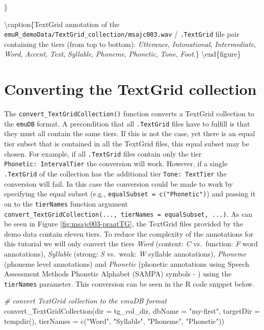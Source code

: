 \documentclass[
]{book}
\newenvironment{Shaded}{\begin{snugshade}}{\end{snugshade}}
\newcommand{\AttributeTok}[1]{\textcolor[rgb]{0.77,0.63,0.00}{#1}}
\newcommand{\CommentTok}[1]{\textcolor[rgb]{0.56,0.35,0.01}{\textit{#1}}}
\newcommand{\FunctionTok}[1]{\textcolor[rgb]{0.00,0.00,0.00}{#1}}
\newcommand{\NormalTok}[1]{#1}
\newcommand{\StringTok}[1]{\textcolor[rgb]{0.31,0.60,0.02}{#1}}
\begin{document}
\}

\textbackslash caption\{TextGrid annotation of the \texttt{emuR\_demoData/TextGrid\_collection/msajc003.wav} / \texttt{.TextGrid} file pair containing the tiers (from top to bottom): \emph{Utterance}, \emph{Intonational}, \emph{Intermediate}, \emph{Word}, \emph{Accent}, \emph{Text}, \emph{Syllable}, \emph{Phoneme}, \emph{Phonetic}, \emph{Tone}, \emph{Foot}.\}\label{fig:msajc003-praatTG}
\textbackslash end\{figure\}

\hypertarget{converting-the-textgrid-collection}{%
\section{Converting the TextGrid collection}\label{converting-the-textgrid-collection}}

The \texttt{convert\_TextGridCollection()} function converts a TextGrid collection to the \texttt{emuDB} format. A precondition that all \texttt{.TextGrid} files have to fulfill is that they must all contain the same tiers. If this is not the case, yet there is an equal tier subset that is contained in all the TextGrid files, this equal subset may be chosen. For example, if all \texttt{.TextGrid} files contain only the tier \texttt{Phonetic:\ IntervalTier} the conversion will work. However, if a single \texttt{.TextGrid} of the collection has the additional tier \texttt{Tone:\ TextTier} the conversion will fail. In this case the conversion could be made to work by specifying the equal subset (e.g., \texttt{equalSubset\ =\ c("Phonetic")}) and passing it on to the \texttt{tierNames} function argument \texttt{convert\_TextGridCollection(...,\ tierNames\ =\ equalSubset,\ ...)}. As can be seen in Figure \ref{fig:msajc003-praatTG}, the TextGrid files provided by the demo data contain eleven tiers. To reduce the complexity of the annotations for this tutorial we will only convert the tiers \emph{Word} (content: \emph{C} vs.~function: \emph{F} word annotations), \emph{Syllable} (strong: \emph{S} vs.~weak: \emph{W} syllable annotations), \emph{Phoneme} (phoneme level annotations) and \emph{Phonetic} (phonetic annotations using Speech Assessment Methods Phonetic Alphabet (SAMPA) symbols - \citet{wells:1997aa}) using the \texttt{tierNames} parameter. This conversion can be seen in the R code snippet below.

\begin{Shaded}
\begin{Highlighting}[]
\CommentTok{\# convert TextGrid collection to the emuDB format}
\FunctionTok{convert\_TextGridCollection}\NormalTok{(}\AttributeTok{dir =}\NormalTok{ tg\_col\_dir,}
                           \AttributeTok{dbName =} \StringTok{"my{-}first"}\NormalTok{,}
                           \AttributeTok{targetDir =} \FunctionTok{tempdir}\NormalTok{(),}
                           \AttributeTok{tierNames =} \FunctionTok{c}\NormalTok{(}\StringTok{"Word"}\NormalTok{, }\StringTok{"Syllable"}\NormalTok{,}
                                         \StringTok{"Phoneme"}\NormalTok{, }\StringTok{"Phonetic"}\NormalTok{))}
\end{Highlighting}
\end{Shaded}
\end{document}
